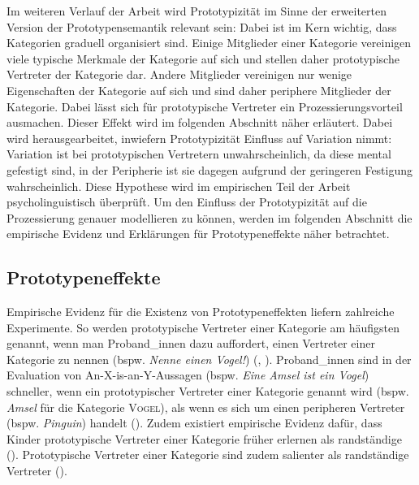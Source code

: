 Im weiteren Verlauf der Arbeit wird Prototypizität im Sinne der erweiterten Version der Prototypensemantik relevant sein: Dabei ist im Kern wichtig, dass Kategorien graduell organisiert sind. Einige Mitglieder einer Kategorie vereinigen viele typische Merkmale der Kategorie auf sich und stellen daher prototypische Vertreter der Kategorie dar. Andere Mitglieder vereinigen nur wenige Eigenschaften der Kategorie auf sich und sind daher periphere Mitglieder der Kategorie. Dabei lässt sich für prototypische Vertreter ein Prozessierungsvorteil ausmachen. Dieser Effekt wird im folgenden Abschnitt näher erläutert. Dabei wird herausgearbeitet, inwiefern Prototypizität Einfluss auf Variation nimmt: Variation ist bei prototypischen Vertretern unwahrscheinlich, da diese mental gefestigt sind, in der Peripherie ist sie dagegen aufgrund der geringeren Festigung wahrscheinlich. Diese Hypothese wird im empirischen Teil der Arbeit psycholinguistisch überprüft. Um den Einfluss der Prototypizität auf die Prozessierung genauer modellieren zu können, werden im folgenden Abschnitt die empirische Evidenz und Erklärungen für Prototypeneffekte näher betrachtet.

\subsection{Prototypeneffekte}
\label{proteffekt}

Empirische Evidenz für die Existenz von Prototypeneffekten liefern zahlreiche Experimente. So werden prototypische Vertreter einer Kategorie am häufigsten genannt, wenn man Proband\_innen dazu auffordert, einen Vertreter einer Kategorie zu nennen (bspw. \textit{Nenne einen Vogel!}) (\cite[38--39]{Kleiber.1993}, \cite[45]{Taylor.1995}). Proband\_innen sind in der Evaluation von An-X-is-an-Y-Aussagen (bspw. \textit{Eine Amsel ist ein Vogel}) schneller, wenn ein prototypischer Vertreter einer Kategorie genannt wird (bspw. \textit{Amsel} für die Kategorie \textsc{Vogel}), als wenn es sich um einen peripheren Vertreter (bspw. \textit{Pinguin}) handelt (\cite[100]{Rosch.2004}). Zudem existiert empirische Evidenz dafür, dass Kinder prototypische Vertreter einer Kategorie früher erlernen als randständige (\cite[100]{Rosch.2004}). Prototypische Vertreter einer Kategorie sind zudem salienter als randständige Vertreter (\cite[566]{Taylor.2015}).

